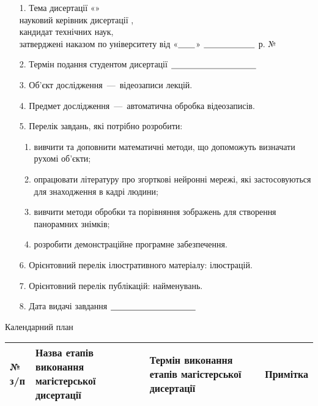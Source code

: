 \begin{enumerate}
    \item[1.]
        Тема дисертації «\theme» \\
        науковий керівник дисертації \mentorName, \\
        кандидат технічних наук, \\
        затверджені наказом по університету від
        «${\text{\underline{\hspace{2em}}}}$»
        ${\text{\underline{\hspace{6em}}}}$  \passYear р. №
    \item[2.]
        Термін подання студентом дисертації ${\text{\underline{\hspace{10em}}}}$
    \item[3.]
        Об’єкт дослідження~---~відеозаписи лекцій.
    \item[4.]
        Предмет дослідження~---~автоматична обробка
        відеозаписів.
    \item[5.]
        Перелік завдань, які потрібно розробити:
        \begin{enumerate}
            \item
                  вивчити та доповнити математичні методи,
                  що допоможуть визначати рухомі об'єкти;
            \item
                  опрацювати літературу про згорткові нейронні мережі, які застосовуються
                  для знаходження в кадрі людини;
            \item
                  вивчити методи обробки та порівняння зображень для створення панорамних знімків;
            \item
                  розробити демонстраційне програмне забезпечення.
      \end{enumerate}
    \item[6.]
        Орієнтовний перелік ілюстративного матеріалу:  ілюстрацій.
    \item[7.]
        Орієнтовний перелік публікацій:  найменувань.
    \item[8.]
        Дата видачі завдання ${\text{\underline{\hspace{10em}}}}$
\end{enumerate}

\begin{center}
    Календарний план
\end{center}

\begin{table}[H]
    \centering
    \begin{tabular}{|p{0.2in} | p{2.1in} | p{2.1in} | p{0.9in}|}
        \hline
        № з/п & Назва етапів виконання магістерської дисертації & Термін виконання етапів магістерської дисертації & Примітка \\
        \hline
    \end{tabular}
\end{table}

